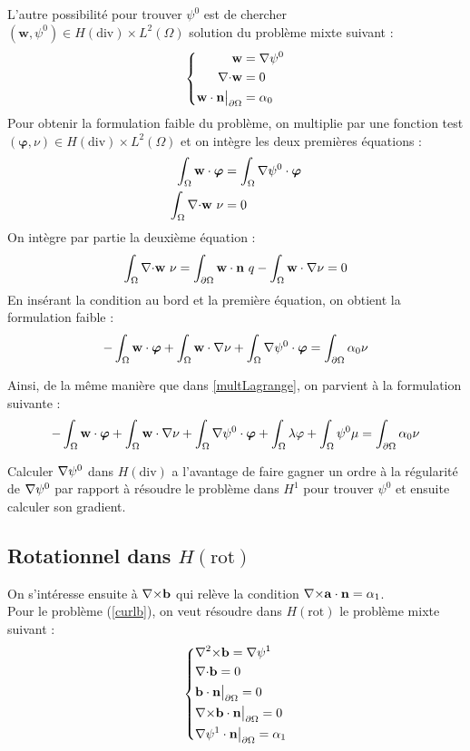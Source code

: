 L'autre possibilité pour trouver $\psi^0$ est de chercher $(\mathbf{w},\psi^0)\in H(\mathrm{div})\times L^2(\Omega)$ solution du problème mixte suivant :
\begin{equation}\label{pbpsidiv}
\left\{\begin{aligned}
\mathbf{w} &= {\nabla} \psi^0\\
{\nabla\cdot} \mathbf{w} &= 0\\
\mathbf{w}\cdot \mathbf{n}{\big\rvert_{\partial\Omega}} &= \alpha_0
\end{aligned}\right.
\end{equation}
Pour obtenir la formulation faible du problème, on multiplie par une fonction test $(\bm{\varphi},\nu)\in H(\mathrm{div})\times L^2(\Omega)$ et on intègre les deux premières équations :
\begin{align*}
\int_\Omega \mathbf{w}\cdot\bm{\varphi} &= \int_\Omega {\nabla}\psi^0\cdot\bm{\varphi}\\
\int_\Omega {\nabla\cdot} \mathbf{w}\ \nu &= 0
\end{align*}
On intègre par partie la deuxième équation :
\[ \int_\Omega {\nabla\cdot} \mathbf{w}\ \nu = \int_{\partial\Omega} \mathbf{w}\cdot \mathbf{n}\ q - \int_\Omega \mathbf{w}\cdot{\nabla}\nu = 0  \]
En insérant la condition au bord et la première équation, on obtient la formulation faible :
\[ -\int_\Omega \mathbf{w}\cdot\bm{\varphi} + \int_\Omega \mathbf{w}\cdot{\nabla}\nu + \int_\Omega {\nabla}\psi^0\cdot\bm{\varphi}  = \int_{\partial\Omega} \alpha_0\nu \]

 Ainsi, de la même manière que dans \ref{multLagrange}, on parvient à la formulation suivante :
\begin{equation}\label{fvpsidiv}
-\int_\Omega \mathbf{w}\cdot\bm{\varphi} + \int_\Omega \mathbf{w}\cdot{\nabla}\nu + \int_\Omega {\nabla}\psi^0\cdot\bm{\varphi} + \int_\Omega \lambda\varphi + \int_\Omega \psi^0\mu = \int_{\partial\Omega} \alpha_0\nu
\end{equation}

Calculer ${\nabla}\psi^0$ dans $H(\mathrm{div})$ a l'avantage de faire gagner un ordre à la régularité de ${\nabla}\psi^0$ par rapport à résoudre le problème dans $H^1$ pour trouver $\psi^0$ et ensuite calculer son gradient.\\

\subsection{Rotationnel dans $H(\mathrm{rot})$}
On s'intéresse ensuite à ${\nabla\times}\mathbf{b}$ qui relève la condition ${\nabla\times}\mathbf{a}\cdot\mathbf{n}=\alpha_1$.\\
Pour le problème (\ref{curlb}), on veut résoudre dans $H(\mathrm{rot})$ le problème mixte suivant : 
\begin{equation}\label{pbbcurl}
\left\{\begin{aligned}
&{\nabla^2\times} \mathbf{b} = {\nabla}\psi^1\\
&{\nabla\cdot} \mathbf{b} = 0\\
&\mathbf{b}\cdot \mathbf{n}{\big\rvert_{\partial\Omega}} = 0\\
&{\nabla\times} \mathbf{b}\cdot \mathbf{n}{\big\rvert_{\partial\Omega}} = 0\\
&{\nabla}\psi^1\cdot \mathbf{n}{\big\rvert_{\partial\Omega}} = \alpha_1
\end{aligned}\right.
\end{equation}

